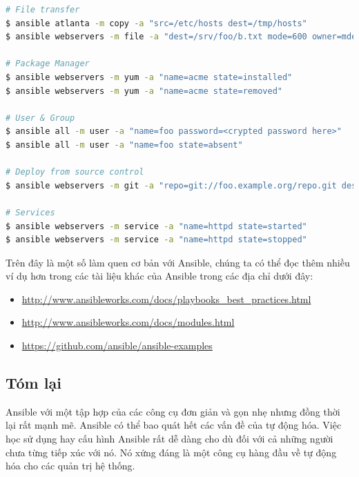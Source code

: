 \begin{lstlisting}[label={lst:ansible_adhoc_command},caption={Ansible thực hiện các chức năng thông qua dòng lệnh}, language=bash, deletekeywords={}]
# File transfer
$ ansible atlanta -m copy -a "src=/etc/hosts dest=/tmp/hosts"
$ ansible webservers -m file -a "dest=/srv/foo/b.txt mode=600 owner=mdehaan group=mdehaan"

# Package Manager
$ ansible webservers -m yum -a "name=acme state=installed"
$ ansible webservers -m yum -a "name=acme state=removed"

# User & Group
$ ansible all -m user -a "name=foo password=<crypted password here>"
$ ansible all -m user -a "name=foo state=absent"

# Deploy from source control
$ ansible webservers -m git -a "repo=git://foo.example.org/repo.git dest=/srv/myapp version=HEAD"

# Services
$ ansible webservers -m service -a "name=httpd state=started"
$ ansible webservers -m service -a "name=httpd state=stopped"

\end{lstlisting}

Trên đây là một số làm quen cơ bản với Ansible, chúng ta có thể đọc thêm nhiều ví dụ hơn trong các tài liệu khác của Ansible trong các địa chỉ dưới đây:

\begin{itemize}
\item \url{http://www.ansibleworks.com/docs/playbooks_best_practices.html}
\item \url{http://www.ansibleworks.com/docs/modules.html}
\item \url{https://github.com/ansible/ansible-examples}
\end{itemize}


\subsection*{Tóm lại}

Ansible với một tập hợp của các công cụ đơn giản và gọn nhẹ nhưng đồng thời lại rất mạnh mẽ. Ansible có thể bao quát hết các vấn đề của tự động hóa. Việc học sử dụng hay cấu hình Ansible rất dễ dàng cho dù đối với cả những người chưa từng tiếp xúc với nó. Nó xứng đáng là một công cụ hàng đầu về tự động hóa cho các quản trị hệ thống.